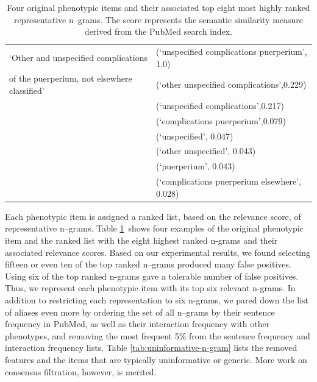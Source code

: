 \documentclass{sig-alternate-05-2015}
\begin{document}
\begin{table}
\begin{center}
\begin{tabular}{l l}
\hline
`Other and unspecified complications & (`unspecified complications puerperium', 1.0)\\
of the puerperium, not elsewhere classified'  &  (`other unspecified complications',0.229)\\
								& (`unspecified complications',0.217)\\
								&  (`complications puerperium',0.079)\\
								& (`unspecified', 0.047)\\
								& (`other unspecified', 0.043) \\
								& (`puerperium', 0.043) \\
								& (`complications puerperium elsewhere', 0.028) \\ 
\bottomrule
\end{tabular}
\end{center}
\caption{Four original phenotypic items and their associated top eight most highly ranked representative n--grams. The score represents the semantic similarity measure derived from the PubMed search index.}
\label{tab:pheno-n-gram}
\end{table}

Each phenotypic item is assigned a ranked list, based on the relevance score, of representative n--grams.
Table \ref{tab:pheno-n-gram}~shows four examples of the original phenotypic item and the ranked list with the eight highest ranked n-grams and their associated relevance scores.
Based on our experimental results, we found selecting fifteen or even ten of the top ranked n--grams produced many false positives. Using six of the top ranked n-grams gave a tolerable number of false positives. Thus, we represent each phenotypic item with its top six relevant n-grams.
In addition to restricting each representation to six n-grams, we pared down the list of aliases even more by ordering the set of all n--grams by their sentence frequency in PubMed, as well as their interaction frequency with other phenotypes, and removing the most frequent 5\% from the sentence frequency and interaction frequency lists.
Table \ref{tab:uninformative-n-gram} lists the removed features and the items that are typically uninformative or generic.
More work on consensus filtration, however, is merited.
\end{document}
